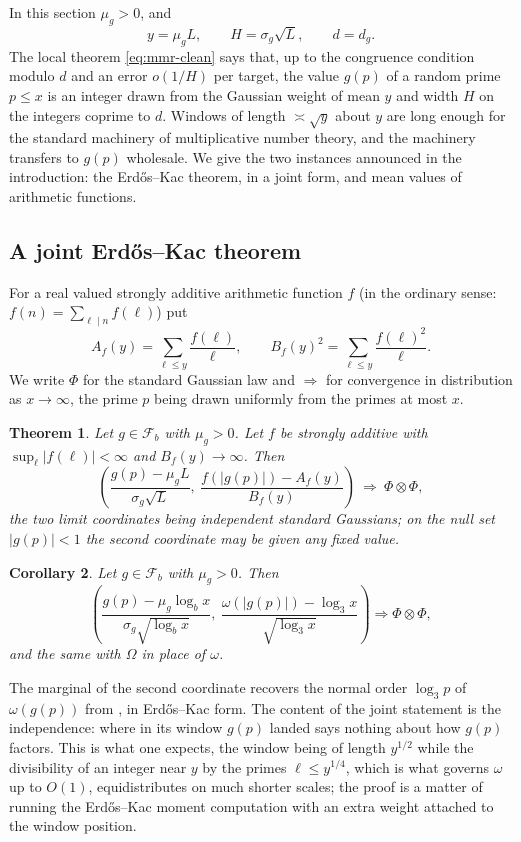 \documentclass[11pt,reqno]{amsart}
\theoremstyle{plain}
\newtheorem{theorem}{Theorem}[section]
\newtheorem{corollary}[theorem]{Corollary}
\theoremstyle{definition}
\begin{document}
In this section $\mu_g>0$, and
\[
y=\mu_gL,\qquad H=\sigma_g\sqrt L,\qquad d=d_g .
\]
The local theorem \eqref{eq:mmr-clean} says that, up to the congruence condition modulo $d$ and an error $o(1/H)$ per target, the value $g(p)$ of a random prime $p\le x$ is an integer drawn from the Gaussian weight of mean $y$ and width $H$ on the integers coprime to $d$. Windows of length $\asymp\sqrt y$ about $y$ are long enough for the standard machinery of multiplicative number theory, and the machinery transfers to $g(p)$ wholesale. We give the two instances announced in the introduction: the Erd\H{o}s--Kac theorem, in a joint form, and mean values of arithmetic functions.

\subsection{A joint Erd\H{o}s--Kac theorem}
For a real valued strongly additive arithmetic function $f$ (in the ordinary sense: $f(n)=\sum_{\ell\mid n}f(\ell)$) put
\[
A_f(y)=\sum_{\ell\le y}\frac{f(\ell)}\ell,\qquad
B_f(y)^{2}=\sum_{\ell\le y}\frac{f(\ell)^{2}}\ell .
\]
We write $\Phi$ for the standard Gaussian law and $\Longrightarrow$ for convergence in distribution as $x\to\infty$, the prime $p$ being drawn uniformly from the primes at most $x$.

\begin{theorem}\label{thm:ek}
Let $g\in\mathcal F_b$ with $\mu_g>0$. Let $f$ be strongly additive with $\sup_\ell|f(\ell)|<\infty$ and $B_f(y)\to\infty$. Then
\[
\left(\frac{g(p)-\mu_gL}{\sigma_g\sqrt L},\ \frac{f(|g(p)|)-A_f(y)}{B_f(y)}\right)
\ \Longrightarrow\ \Phi\otimes\Phi ,
\]
the two limit coordinates being independent standard Gaussians; on the null set $|g(p)|<1$ the second coordinate may be given any fixed value.
\end{theorem}

\begin{corollary}\label{cor:omega}
Let $g\in\mathcal F_b$ with $\mu_g>0$. Then
\[
\left(\frac{g(p)-\mu_g\log_bx}{\sigma_g\sqrt{\log_bx}},\ \frac{\omega(|g(p)|)-\log_3x}{\sqrt{\log_3x}}\right)
\Longrightarrow \Phi\otimes\Phi,
\]
and the same with $\Omega$ in place of $\omega$.
\end{corollary}

The marginal of the second coordinate recovers the normal order $\log_3p$ of $\omega(g(p))$ from \cite[Theorem 1.9]{vibefrtz}, in Erd\H{o}s--Kac form. The content of the joint statement is the independence: where in its window $g(p)$ landed says nothing about how $g(p)$ factors. This is what one expects, the window being of length $y^{1/2}$ while the divisibility of an integer near $y$ by the primes $\ell\le y^{1/4}$, which is what governs $\omega$ up to $O(1)$, equidistributes on much shorter scales; the proof is a matter of running the Erd\H{o}s--Kac moment computation with an extra weight attached to the window position.
\end{document}
